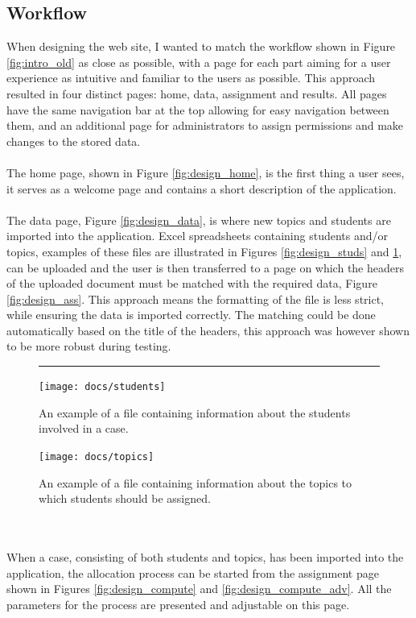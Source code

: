 \subsection{Workflow}
When designing the web site, I wanted to match the workflow shown in Figure \ref{fig:intro_old} as close as possible, with a page for each part aiming for a user experience as intuitive and familiar to the users as possible. This approach resulted in four distinct pages: home, data, assignment and results. All pages have the same navigation bar at the top allowing for easy navigation between them, and an additional page for administrators to assign permissions and make changes to the stored data. 
\\\\
The home page, shown in Figure \ref{fig:design_home}, is the first thing a user sees,  it serves as a welcome page and contains a short description of the application.
\\\\
The data page, Figure \ref{fig:design_data}, is where new topics and students are imported into the application. Excel spreadsheets containing students and/or topics, examples of these files are illustrated in Figures \ref{fig:design_studs} and \ref{fig:design_tops}, can be uploaded and the user is then transferred to a page on which the headers of the uploaded document must be matched with the required data, Figure \ref{fig:design_ass}. This approach means the formatting of the file is less strict, while ensuring the data is imported correctly. The matching could be done automatically based on the title of the headers, this approach was however shown to be more robust during testing.%
\begin{figure}[b!]
\hrule
\vspace*{0.2cm}
\texttt{[image: docs/students]}
\caption{An example of a file containing information about the students involved in a case.}
\label{fig:design_studs}
\vspace*{0.1cm}
\texttt{[image: docs/topics]}
\caption{An example of a file containing information about the topics to which students should be assigned.}
\label{fig:design_tops}
\end{figure}
\\\\
When a case, consisting of both students and topics, has been imported into the application, the allocation process can be started from the assignment page shown in Figures \ref{fig:design_compute} and \ref{fig:design_compute_adv}. All the parameters for the process are presented and adjustable on this page.

